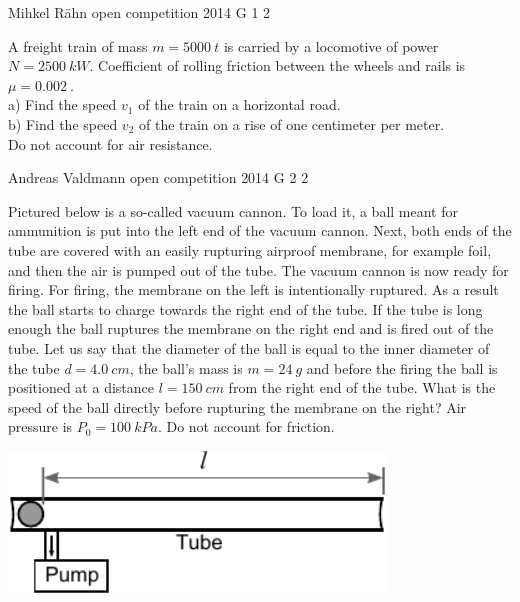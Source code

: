 \documentclass[11pt]{article}
\begin{document}
{Mihkel Rähn} %
{open competition} %
{2014} %
{G 1} %
{2} %
{

\ifEngStatement
A freight train of mass $m=\SI{5000}{t}$ is carried by a locomotive of power $N=\SI{2500}{kW}$. Coefficient of rolling friction between the wheels and rails is $\mu=\SI{0,002}{}$.\\
a) Find the speed $v_1$ of the train on a horizontal road.\\
b) Find the speed $v_2$ of the train on a rise of one centimeter per meter.\\
Do not account for air resistance.
\fi
}

{Andreas Valdmann} %
{open competition} %
{2014} %
{G 2} %
{2} %
{

\ifEngStatement
Pictured below is a so-called vacuum cannon. To load it, a ball meant for ammunition is put into the left end of the vacuum cannon. Next, both ends of the tube are covered with an easily rupturing airproof membrane, for example foil, and then the air is pumped out of the tube. The vacuum cannon is now ready for firing. For firing, the membrane on the left is intentionally ruptured. As a result the ball starts to charge towards the right end of the tube. If the tube is long enough the ball ruptures the membrane on the right end and is fired out of the tube. Let us say that the diameter of the ball is equal to the inner diameter of the tube $d=\SI{4,0}{cm}$, the ball’s mass is $m=\SI{24}{g}$ and before the firing the ball is positioned at a distance $l=\SI{150}{cm}$ from the right end of the tube. What is the speed of the ball directly before rupturing the membrane on the right? Air pressure is $P_0=\SI{100}{kPa}$. Do not account for friction.
\begin{center}
  \includegraphics[width=0.75\textwidth]{2014-lahg-02-vaakumkahur_ing}
\end{center}
\fi
}
\end{document}
